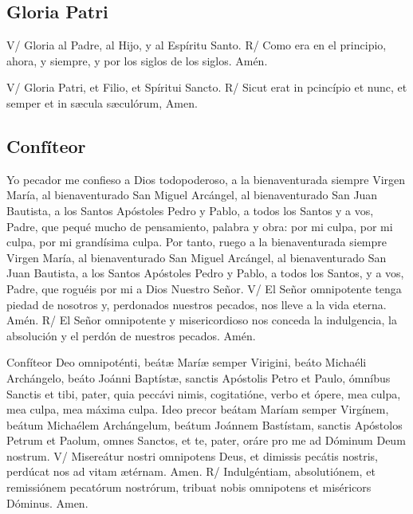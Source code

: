 \documentclass[./devocionario.tex]{subfiles}
\begin{document}
\subsection*{Gloria Patri}
\begin{multicols}{2}
    V/ Gloria al Padre, al Hijo, y al Espíritu Santo.\newline
    R/ Como era en el principio, ahora, y siempre, y por los siglos de los siglos. Amén.\newline
    
    \columnbreak
    
    V/ Gloria Patri, et Filio, et Spíritui Sancto.\newline
    R/ Sicut erat in pcincípio et nunc, et semper et in sæcula sæculórum, Amen.
\end{multicols}

\subsection*{Confíteor}
\begin{multicols}{2}
    Yo pecador me confieso a Dios todopoderoso, a la bienaventurada siempre Virgen María, al bienaventurado San Miguel Arcángel, 
    al bienaventurado San Juan Bautista, a los Santos Apóstoles Pedro y Pablo, a todos los Santos y a vos, Padre, que pequé mucho 
    de pensamiento, palabra y obra: por mi culpa, por mi culpa, por mi grandísima culpa. Por tanto, ruego a la bienaventurada 
    siempre Virgen María, al bienaventurado San Miguel Arcángel, al bienaventurado San Juan Bautista, a los Santos Apóstoles 
    Pedro y Pablo, a todos los Santos, y a vos, Padre, que roguéis por mi a Dios Nuestro Señor.\newline
    V/ El Señor omnipotente tenga piedad de nosotros y, perdonados nuestros pecados, nos lleve a la vida eterna. Amén.\newline
    R/ El Señor omnipotente y misericordioso nos conceda la indulgencia, la absolución y el perdón de nuestros pecados. Amén.

    \columnbreak

    Confíteor Deo omnipoténti, beátæ Maríæ semper Virigini, beáto Michaéli Archángelo, beáto Joánni Baptístæ, sanctis Apóstolis Petro et Paulo, 
    ómníbus Sanctis et tibi, pater, quia peccávi nimis, cogitatióne, verbo et ópere, mea culpa, mea culpa, mea máxima culpa. Ideo precor beátam 
    Maríam semper Virgínem, beátum Michaélem Archángelum, beátum Joánnem Bastístam, sanctis Apóstolos Petrum et Paolum, omnes Sanctos, et te, pater, 
    oráre pro me ad Dóminum Deum nostrum.\newline
    V/ Misereátur nostri omnipotens Deus, et dimissis pecátis nostris, perdúcat nos ad vitam ætérnam. Amen.\newline
    R/ Indulgéntiam, absolutiónem, et remissiónem pecatórum nostrórum, tribuat nobis omnipotens et miséricors Dóminus. Amen.
\end{multicols}
\end{document}
